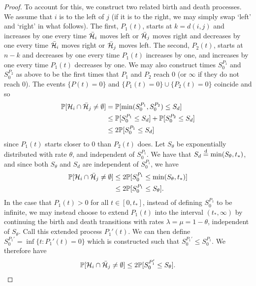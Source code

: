 \begin{proof}
		To account for this, we construct two related birth and death processes. We assume that $i$ is to the left of $j$ (if it is to the right, we may simply swap `left' and `right' in what follows). The first, $P_1(t)$, starts at $k = d(i,j)$ and increases by one every time $\bar{\mathcal{H}}_i$ moves left or $\bar{\mathcal{H}}_j$ moves right and decreases by one every time $\bar{\mathcal{H}}_i$ moves right or $\bar{\mathcal{H}}_j$ moves left. The second, $P_2(t)$, starts at $n - k$ and decreases by one every time $P_1(t)$ increases by one, and increases by one every time $P_1(t)$ decreases by one. We may also construct times $S^{P_1}_0$ and $S^{P_2}_0$ as above to be the first times that $P_1$ and $P_2$ reach 0 (or $\infty$ if they do not reach 0). The events $\{P(t)  = 0\}$ and $\{P_1(t) = 0\} \cup \{P_2(t) = 0\}$ coincide and so
		\begin{align}
			\mathbb{P}[\mathcal{H}_i \cap \bar{\mathcal{H}}_j \neq \emptyset] &= \mathbb{P}[\min(S^{P_1}_0, S^{P_2}_0) \leq S_d]\\
			 &\leq \mathbb{P}[S^{P_1}_0 \leq S_d] + \mathbb{P}[S^{P_2}_0 \leq S_d]\\
			 &\leq 2\mathbb{P}[S^{P_1}_0 \leq S_d]
		\end{align}
		since $P_1(t)$ starts closer to 0 than $P_2(t)$ does. Let $S_\theta$ be exponentially distributed with rate $\theta$, and independent of $S_0^{P_1}$. We have that $S_d \overset{\mathrm{d}}{=} \min(S_\theta, t_*)$, and since both $S_\theta$ and $S_d$ are independent of $S_0^{P_1}$, we have
		\begin{align}
			\mathbb{P}[\mathcal{H}_i \cap \bar{\mathcal{H}}_j \neq \emptyset] &\leq 2\mathbb{P}[S^{P_1}_0 \leq \min(S_\theta, t_*)] \\
			&\leq 2\mathbb{P}[S^{P_1}_0 \leq S_\theta].
		\end{align}
		In the case that $P_1(t) > 0$ for all $t \in [0, t_*]$, instead of defining $S_0^{P_1}$ to be infinite, we may instead choose to extend $P_1(t)$ into the interval $(t_*, \infty)$ by continuing the birth and death transitions with rates $\lambda = \mu = 1 - \theta$, independent of $S_\theta$. Call this extended process $P_1'(t)$. We can then define $S_0^{P_1'} = \inf\{t : P_1'(t) = 0\}$ which is constructed such that $S_0^{P_1'} \leq S_0^{P_1}$. We therefore have
		\begin{align}
			\mathbb{P}[\mathcal{H}_i \cap \bar{\mathcal{H}}_j \neq \emptyset] \leq 2\mathbb{P}[S^{P_1'}_0 \leq S_\theta].
		\end{align}


\end{proof}
